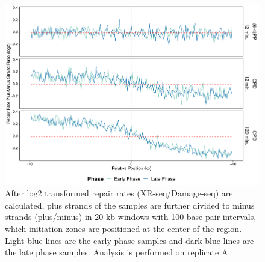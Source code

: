 \begin{figure}[H]
\begin{center}
\includegraphics[width=\textwidth]{Chapters/7_appendix/figures/supfig42}
\caption[Repair rate plus/minus ratio of initiation zones in 20 kb (replicate A).]{After log2 transformed repair rates (XR-seq/Damage-seq) are calculated, plus strands of the samples are further divided to minus strands (plus/minus) in 20 kb windows with 100 base pair intervals, which initiation zones are positioned at the center of the region. Light blue lines are the early phase samples and dark blue lines are the late phase samples. Analysis is performed on replicate A.}
\label{supfig:rrpm20inzonesA}
\end{center}
\end{figure}

